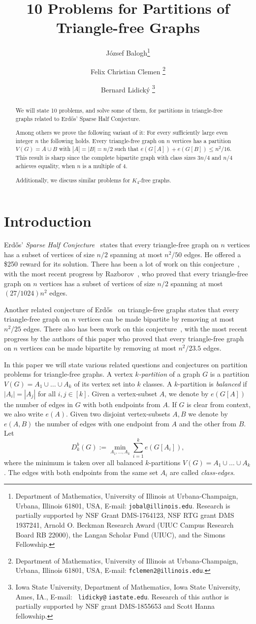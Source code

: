 \documentclass[11pt]{article}
\author{%
J\'ozsef Balogh\footnote{Department of Mathematics, University of Illinois at Urbana-Champaign, Urbana, Illinois 61801, USA, E-mail: \texttt{jobal@illinois.edu}. Research is partially supported by NSF Grant DMS-1764123, NSF RTG grant DMS 1937241, Arnold O. Beckman Research Award (UIUC Campus Research Board RB 22000), the Langan Scholar Fund (UIUC), and the Simons Fellowship.} 
\and Felix Christian Clemen \footnote {Department of Mathematics, University of Illinois at Urbana-Champaign, Urbana, Illinois 61801, USA, E-mail: \texttt{fclemen2@illinois.edu}.}
 \and Bernard Lidick\'{y} \footnote {Iowa State University, Department of Mathematics, Iowa State University, Ames, IA., E-mail: \texttt{ lidicky@} \texttt{iastate.edu}. Research of this author is partially supported by NSF grant DMS-1855653 and Scott Hanna fellowship.}
}
\title{10 Problems for Partitions of Triangle-free Graphs}
\theoremstyle{definition}
\numberwithin{theo}{section}
\begin{document}
\maketitle 
\begin{abstract}
    We will state 10 problems, and solve some of them, for partitions in triangle-free graphs related to Erd\H{o}s' Sparse Half Conjecture.
    
    Among others we prove the following variant of it: For every sufficiently large even integer $n$ the following holds. Every triangle-free graph on $n$ vertices has a partition $V(G)=A\cup B$ with $|A|=|B|=n/2$ such that $e(G[A])+e(G[B])\leq n^2/16$. This result is sharp since the complete bipartite graph with class sizes $3n/4$ and $n/4$ achieves equality, when $n$ is a multiple of 4.
    
    Additionally, we discuss similar problems for $K_4$-free graphs. 
\end{abstract}
\section{Introduction}
Erd\H{o}s' \emph{Sparse Half Conjecture}~\cite{MR0409246,MR1439273} states that every triangle-free graph on $n$ vertices has a subset of vertices of size $n/2$ spanning at most $n^2/50$ edges. He offered a \$250 reward for its solution. There has been a lot of work on this conjecture~\cite{MR1273598,MR2232396,sparsehalfraz,MR3383248}, with the most recent progress by Razborov~\cite{sparsehalfraz}, who proved that every triangle-free graph on $n$ vertices has a subset of vertices of size $n/2$ spanning at most $(27/1024)n^2$ edges.  

Another related conjecture of Erd\H{o}s~\cite{MR0409246} on triangle-free graphs states that every triangle-free graph on $n$ vertices can be made bipartite by removing at most $n^2/25$ edges. There also has been work on this conjecture~\cite{Howtotriangle,Howmany,flagbipartite}, with the most recent progress by the authors of this paper who proved that every triangle-free graph on $n$ vertices can be made bipartite by removing at most $n^2/23.5$ edges.    

In this paper we will state various related questions and conjectures on partition problems for triangle-free graphs. A vertex \emph{$k$-partition} of a graph $G$ is a partition $V(G)=A_1\cup\ldots \cup A_k$ of its vertex set into $k$ classes. A $k$-partition is \emph{balanced} if $|A_i|=|A_j|$ for all $i,j\in[k]$. Given a vertex-subset $A$, we denote by $e(G[A])$ the number of edges in $G$ with both endpoints from $A$. If $G$ is clear from context, we also write $e(A)$. Given two disjoint vertex-subsets $A,B$ we denote by $e(A,B)$ the number of edges with one endpoint from $A$ and the other from $B$.
Let 
\[
D_k^b(G) :=  \min_{A_1,\ldots,A_k} \sum_{i=1}^k e(G[A_i]),
\]
where the minimum is taken over all balanced $k$-partitions $V(G)=A_1\cup\ldots \cup A_k$. 
The edges with both endpoints from the same set $A_i$ are called \emph{class-edges}.
\end{document}
